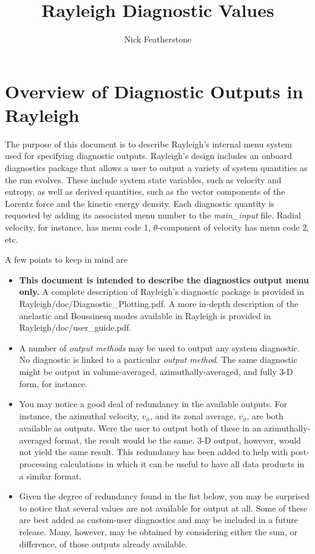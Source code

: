 \documentclass[10pt,letterpaper]{article}
\begin{document}
\title{Rayleigh Diagnostic Values}
\author{Nick Featherstone}

\maketitle

\tableofcontents

\clearpage

\section{Overview of Diagnostic Outputs in Rayleigh}
The purpose of this document is to describe Rayleigh's internal menu system used for specifying diagnostic outputs.  Rayleigh's design includes an onboard diagnostics package that allows a user to output a variety of system quantities as the run evolves.  These include system state variables, such as velocity and entropy, as well as derived quantities, such as the vector components of the Lorentz force and the kinetic energy density.  Each diagnostic quantity is requested by adding its associated menu number to the \textit{main\_input} file.  Radial velocity, for instance, has menu code 1, $\theta$-component of velocity has menu code 2, etc.    

A few points to keep in mind are
\begin{itemize}
    \item \textbf{This document is intended to describe the diagnostics output menu only.}   A complete description of Rayleigh's diagnostic package is provided in Rayleigh/doc/Diagnostic\_Plotting.pdf.   A more in-depth description of the anelastic and Boussinesq modes available in Rayleigh is provided in Rayleigh/doc/user\_guide.pdf.
    \item A number of \textit{output methods} may be used to output any system diagnostic.  No diagnostic is linked to a particular \textit{output method}.  The same diagnostic might be output in volume-averaged, azimuthally-averaged, and fully 3-D form, for instance.
    \item You may notice a good deal of redundancy in the available outputs.  For instance, the azimuthal velocity, $v_\phi$, and its zonal average, $\overline{v_\phi}$, are both available as outputs.  Were the user to output both of these in an azimuthally-averaged format, the result would be the same.  3-D output, however, would not yield the same result.  This redundancy has been added to help with post-processing calculations in which it can be useful to have all data products in a similar format.
    \item Given the degree of redundancy found in the list below, you may be surprised to notice that several values are not available for output at all.  Some of these are best added as custom-user diagnostics and may be included in a future release.  Many, however, may be obtained by considering either the sum, or difference, of those outputs already available.
\end{itemize}  
 
\end{document}
